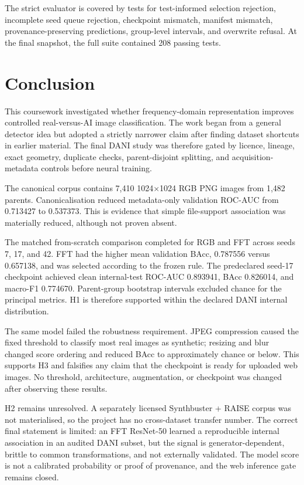 \documentclass[12pt,a4paper]{article}
\begin{document}
The strict evaluator is covered by tests for test-informed selection rejection, incomplete seed
queue rejection, checkpoint mismatch, manifest mismatch, provenance-preserving predictions,
group-level intervals, and overwrite refusal. At the final snapshot, the full suite contained 208
passing tests.

\section{Conclusion}

This coursework investigated whether frequency-domain representation improves controlled
real-versus-AI image classification. The work began from a general detector idea but adopted a
strictly narrower claim after finding dataset shortcuts in earlier material. The final DANI study
was therefore gated by licence, lineage, exact geometry, duplicate checks, parent-disjoint
splitting, and acquisition-metadata controls before neural training.

The canonical corpus contains 7,410 1024×1024 RGB PNG images from 1,482 parents. Canonicalisation
reduced metadata-only validation ROC-AUC from 0.713427 to 0.537373. This is evidence that simple
file-support association was materially reduced, although not proven absent.

The matched from-scratch comparison completed for RGB and FFT across seeds 7, 17, and 42. FFT had
the higher mean validation BAcc, 0.787556 versus 0.657138, and was selected according to the frozen
rule. The predeclared seed-17 checkpoint achieved clean internal-test ROC-AUC 0.893941, BAcc
0.826014, and macro-F1 0.774670. Parent-group bootstrap intervals excluded chance for the principal
metrics. H1 is therefore supported within the declared DANI internal distribution.

The same model failed the robustness requirement. JPEG compression caused the fixed threshold to
classify most real images as synthetic; resizing and blur changed score ordering and reduced BAcc
to approximately chance or below. This supports H3 and falsifies any claim that the checkpoint is
ready for uploaded web images. No threshold, architecture, augmentation, or checkpoint was changed
after observing these results.

H2 remains unresolved. A separately licensed Synthbuster + RAISE corpus was not materialised, so
the project has no cross-dataset transfer number. The correct final statement is limited: an FFT
ResNet-50 learned a reproducible internal association in an audited DANI subset, but the signal is
generator-dependent, brittle to common transformations, and not externally validated. The model
score is not a calibrated probability or proof of provenance, and the web inference gate remains
closed.
\end{document}
